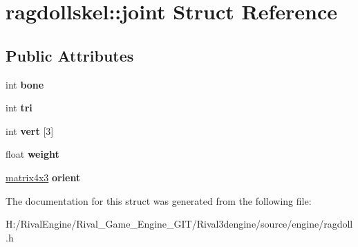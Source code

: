 \hypertarget{structragdollskel_1_1joint}{}\section{ragdollskel\+:\+:joint Struct Reference}
\label{structragdollskel_1_1joint}
\subsection*{Public Attributes}
\begin{DoxyCompactItemize}
\item 
\mbox{\label{structragdollskel_1_1joint_a6febe24e709a59557faa89d96779fe26}} 
int {\bfseries bone}
\item 
\mbox{\label{structragdollskel_1_1joint_a118d81a5157e26640070c2e237614adb}} 
int {\bfseries tri}
\item 
\mbox{\label{structragdollskel_1_1joint_afed68485e392732eed254d2dccea14bc}} 
int {\bfseries vert} \mbox{[}3\mbox{]}
\item 
\mbox{\label{structragdollskel_1_1joint_a9a4e6b3526fc526d9e0b85302229f04a}} 
float {\bfseries weight}
\item 
\mbox{\label{structragdollskel_1_1joint_ad977a2164954e49b78f17b4e19c3f5ea}} 
\hyperlink{structmatrix4x3}{matrix4x3} {\bfseries orient}
\end{DoxyCompactItemize}


The documentation for this struct was generated from the following file\+:\begin{DoxyCompactItemize}
\item 
H\+:/\+Rival\+Engine/\+Rival\+\_\+\+Game\+\_\+\+Engine\+\_\+\+G\+I\+T/\+Rival3dengine/source/engine/ragdoll.\+h\end{DoxyCompactItemize}
